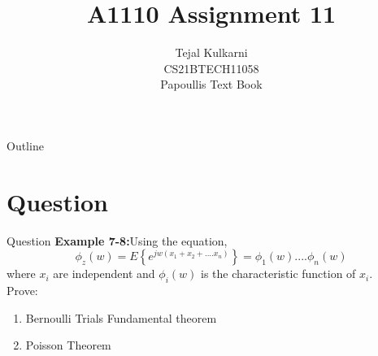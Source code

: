 \documentclass{beamer}
\title{A1110 Assignment 11 }
\author{Tejal Kulkarni \\ CS21BTECH11058 \\\vspace*{20pt} Papoullis Text Book }
\begin{document}
\providecommand{\pr}[1]{\ensuremath{\Pr\left(#1\right)}}
\providecommand{\cdf}[2]{\ensuremath{\text{F}_{#1}\left(#2\right)}}
\providecommand{\qfunc}[1]{\ensuremath{Q\left(#1\right)}}
\providecommand{\sbrak}[1]{\ensuremath{{}\left[#1\right]}}
\providecommand{\lsbrak}[1]{\ensuremath{{}\left[#1\right.}}
\providecommand{\rsbrak}[1]{\ensuremath{{}\left.#1\right]}}
\providecommand{\brak}[1]{\ensuremath{\left(#1\right)}}
\providecommand{\lbrak}[1]{\ensuremath{\left(#1\right.}}
\providecommand{\rbrak}[1]{\ensuremath{\left.#1\right)}}
\providecommand{\cbrak}[1]{\ensuremath{\left\{#1\right\}}}
\providecommand{\lcbrak}[1]{\ensuremath{\left\{#1\right.}}
\providecommand{\rcbrak}[1]{\ensuremath{\left.#1\right\}}}
\newcommand*{\permcomb}[4][0mu]{{{}^{#3}\mkern#1#2_{#4}}}
\newcommand*{\perm}[1][-3mu]{\permcomb[#1]{P}}
\newcommand*{\comb}[1][-1mu]{\permcomb[#1]{C}}
\renewcommand{\thetable}{\arabic{table}} 

\begin{frame}
    \titlepage
\end{frame}

\begin{frame}{Outline}
  \tableofcontents
\end{frame}

\section{Question}
\begin{frame}{Question}
\textbf{Example 7-8:}Using the equation,
\begin{equation}
    \phi_z\brak{w} = E\cbrak{e^{jw(x_1+x_2+....x_n)}} = \phi_1\brak{w}....\phi_n\brak{w} \label{Eq 1}
\end{equation}
where $x_i$ are independent and $\phi_i\brak{w}$ is the characteristic function of $x_i$. \\
Prove:
\begin{enumerate}[label = (\alph*)]
    \item Bernoulli Trials Fundamental theorem
    \item Poisson Theorem
\end{enumerate}
\end{frame}
\end{document}

